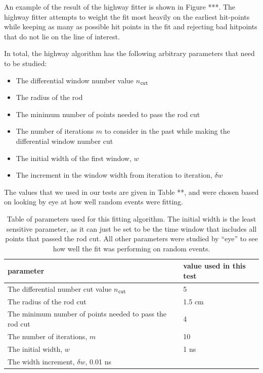 \documentclass[12pt,twoside,letterpaper]{article}
\begin{document}
An example of the result of the highway fitter is shown in Figure ***. The highway fitter attempts to weight the fit most heavily on the earliest hit-points while keeping as many as possible hit points in the fit and rejecting bad hitpoints that do not lie on the line of interest. 


In total, the highway algorithm has the following arbitrary parameters that need to be studied:
\begin{itemize}
\item The differential window number value $n_{\texttt{cut}}$
\item The radius of the rod
\item The minimum number of points needed to pass the rod cut
\item The number of iterations $m$ to consider in the past while making the differential window number cut
\item The initial width of the first window, $w$
\item The increment in the window width from iteration to iteration, $\delta w$
\end{itemize}


The values that we used in our tests are given in Table **, and were chosen based on looking by eye at how well random events were fitting. 

\begin{table}[h!]
\begin{tabular}{|l|l|}\hline\hline
\textbf{parameter} & \textbf{value used in this test} \\ \hline
The differential number cut value $n_{\texttt{cut}}$ & 5 \\ \hline
The radius of the rod cut & 1.5 cm \\ \hline
The minimum number of points needed to pass the rod cut & 4 \\ \hline
The number of iterations, $m$ & 10 \\ \hline
The initial width, $w$ & 1 ns \\ \hline
The width increment, $\delta w$, 0.01 ns \\ \hline
\end{tabular}
\caption{Table of parameters used for this fitting algorithm. The initial width is the least sensitive parameter, as it can just be set to be the time window that includes all points that passed the rod cut. All other parameters were studied by ``eye'' to see how well the fit was performing on random events. }\label{highway_params}
\end{table}
\end{document}
